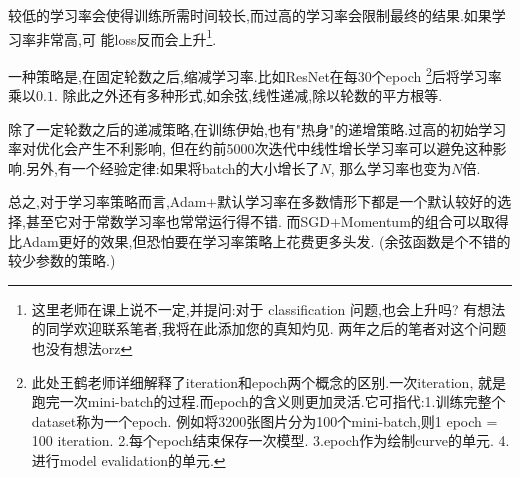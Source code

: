 较低的学习率会使得训练所需时间较长,而过高的学习率会限制最终的结果.如果学习率非常高,可
能loss反而会上升\footnote{这里老师在课上说不一定,并提问:对于 classification 问题,也会上升吗?
有想法的同学欢迎联系笔者,我将在此添加您的真知灼见.
两年之后的笔者对这个问题也没有想法orz}.

一种策略是,在固定轮数之后,缩减学习率.比如ResNet在每30个epoch
\footnote{此处王鹤老师详细解释了iteration和epoch两个概念的区别.一次iteration,
就是跑完一次mini-batch的过程.而epoch的含义则更加灵活.它可指代:1.训练完整个dataset称为一个epoch.
例如将3200张图片分为100个mini-batch,则1 epoch = 100 iteration.  2.每个epoch结束保存一次模型.  
3.epoch作为绘制curve的单元.  4.进行model evalidation的单元.}后将学习率乘以$0.1$.
除此之外还有多种形式,如余弦,线性递减,除以轮数的平方根等.

除了一定轮数之后的递减策略,在训练伊始,也有"热身"的递增策略.过高的初始学习率对优化会产生不利影响,
但在约前5000次迭代中线性增长学习率可以避免这种影响.另外,有一个经验定律:如果将batch的大小增长了$N$,
那么学习率也变为$N$倍.

总之,对于学习率策略而言,Adam+默认学习率在多数情形下都是一个默认较好的选择,甚至它对于常数学习率也常常运行得不错.
而SGD+Momentum的组合可以取得比Adam更好的效果,但恐怕要在学习率策略上花费更多头发.
(余弦函数是个不错的较少参数的策略.)
